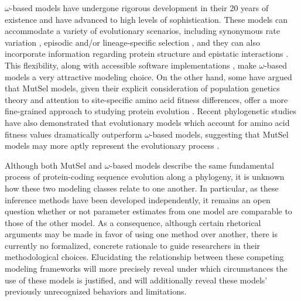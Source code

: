 \documentclass[11pt]{article}
\begin{document}
$\omega$-based models have undergone rigorous development in their 20 years of existence and have advanced to high levels of sophistication. These models can accommodate a variety of evolutionary scenarios, including synonymous rate variation \cite{MuseGaut1994,KosakovskyPondMuse2005}, episodic \cite{KosakovskyPondetal2011,MEME} and/or lineage-specific selection \cite{YangNielsen2002,Zhangetal2005,KosakovskyPondFrost2005a}, and they can also incorporate information regarding protein structure and epistatic interactions \cite{Robinsonetal2003,Thorneetal2007,Rodrigueetal2009,Scherreretal2012,MeyerWilke2012}. This flexibility, along with accessible software implementations \cite{KosakovskyPondetal2005,Yang2007,Delport2010}, make $\omega$-based models a very attractive modeling choice. On the other hand, some have argued that MutSel models, given their explicit consideration of population genetics theory and attention to site-specific amino acid fitness differences, offer a more fine-grained approach to studying protein evolution \cite{HalpernBruno1998,Rodrigueetal2010,Tamurietal2012,Thorne2012}. Recent phylogenetic studies have also demonstrated that evolutionary models which account for amino acid fitness values dramatically outperform $\omega$-based models, suggesting that MutSel models may more aptly represent the evolutionary process \cite{Bloom2014a, Bloom2014b}. 
		
Although both MutSel and $\omega$-based models describe the same fundamental process of protein-coding sequence evolution along a phylogeny, it is unknown how these two modeling classes relate to one another. In particular, as these inference methods have been developed independently, it remains an open question whether or not parameter estimates from one model are comparable to those of the other model. As a consequence, although certain rhetorical arguments may be made in favor of using one method over another, there is currently no formalized, concrete rationale to guide researchers in their methodological choices. Elucidating the relationship between these competing modeling frameworks will more precisely reveal under which circumstances the use of these models is justified, and will additionally reveal these models' previously unrecognized behaviors and limitations.
		
\end{document}
